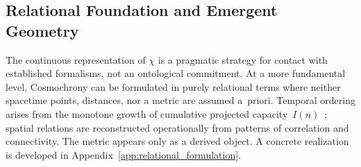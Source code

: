 \subsection{Relational Foundation and Emergent Geometry}
  \label{subsec:relational-foundation-pointer}

  The continuous representation of $\chi$ is a pragmatic strategy for
  contact with established formalisms, not an ontological commitment.
  At a more fundamental level, Cosmochrony can be formulated in purely
  relational terms where neither spacetime points, distances, nor a
  metric are assumed a~priori.
  Temporal ordering arises from the monotone growth of cumulative projected
  capacity~$I(n)$~\cite{Beau2026pto}; spatial relations
  are reconstructed operationally from patterns of correlation and
  connectivity.
  The metric appears only as a derived object.
  A concrete realization is developed in
  Appendix~\ref{app:relational_formulation}.
